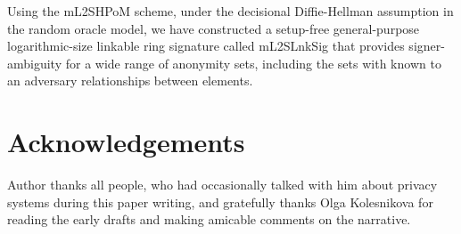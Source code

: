 \documentclass{mathcryptology} %
\theoremstyle{title}
\theoremstyle{titleof}
\begin{document}
    Using the mL2SHPoM scheme, under the decisional Diffie-Hellman assumption in the random oracle model, we have constructed a setup-free general-purpose logarithmic-size linkable ring signature called mL2SLnkSig that provides signer-ambiguity for a wide range of anonymity sets, including the sets with known to an adversary relationships between elements.


\section*{Acknowledgements}
    Author thanks all people, who had occasionally talked with him about privacy systems during this paper writing, and gratefully thanks Olga Kolesnikova for reading the early drafts and making amicable comments on the narrative.


\printbibliography%
\end{document}
